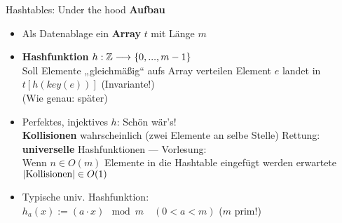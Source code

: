 \begin{frame}{Hashtables: Under the hood} 
	\textbf{Aufbau} \\
	\begin{itemize}
		\item Als Datenablage ein \textbf{Array} $t$ mit Länge $m$
		\pause
		\item \textbf{Hashfunktion} $h: \mathbb{Z} \longrightarrow \{0, ..., m-1\}$ \\
		Soll Elemente „gleichmäßig“ aufs Array verteilen
		\pause
		\implitem Element $e$ landet in $t\left\lbrack h\left(key(e) \right)\right\rbrack$ \quad  (Invariante!) \\
		{\small (Wie genau: später)}
		\pause
		\item[\Cons] Perfektes, injektives $h$: Schön wär's! \\
		\impl \textbf{Kollisionen} wahrscheinlich (zwei Elemente an selbe Stelle)
		\pause
		\implitem Rettung: \textbf{universelle} Hashfunktionen \quad --- \quad  Vorlesung: \\
		Wenn $n \in O(m)$ Elemente in die Hashtable eingefügt werden \impl erwartete $ \left| \text{Kollisionen} \right| \in O(1)$ 
		\pause
		\item Typische univ. Hashfunktion: \\
		$h_a(x) := (a \cdot x) \mod m \quad (0 < a < m)$ \quad ($m$ prim!)
		
	\end{itemize}
\end{frame}


